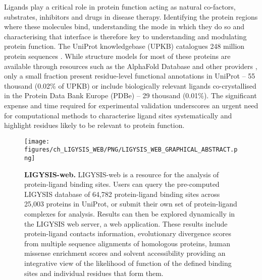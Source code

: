 Ligands play a critical role in protein function acting as natural co-factors, substrates, inhibitors and drugs in disease therapy. Identifying the protein regions where these molecules bind, understanding the mode in which they do so and characterising that interface is therefore key to understanding and modulating protein function. The UniProt knowledgebase (UPKB) catalogues 248 million protein sequences \cite{UNIPROT_2018_UNIPROT, UNIPROT_2023_UNIPROT}. While structure models for most of these proteins are available through resources such as the AlphaFold Database \cite{JUMPER_2021_ALPHAFOLD, VARADI_2022_ALPHAFOLDDB, ABRAMSON_2024_ALPHAFOLD3} and other providers \cite{GUEX_2009_SWISSMODEL, BEIENERT_2016_SWISSMODEL, WATERHOUSE_2018_SWISSMODEL}, only a small fraction present residue-level functional annotations in UniProt – 55 thousand (0.02\% of UPKB) or include biologically relevant ligands co-crystallised in the Protein Data Bank Europe (PDBe) \cite{BERMAN_2003_PDB, wwPDB_2019_PDB} – 29 thousand (0.01\%). The significant expense and time required for experimental validation underscores an urgent need for computational methods to characterise ligand sites  systematically and highlight residues likely to be relevant to protein function.

\begin{figure}[htb!]
    \centering
    \texttt{[image: figures/ch\_LIGYSIS\_WEB/PNG/LIGYSIS\_WEB\_GRAPHICAL\_ABSTRACT.png]}
    \caption[LIGYSIS-web]{\textbf{LIGYSIS-web.} LIGYSIS-web is a resource for the analysis of protein-ligand binding sites. Users can query the pre-computed LIGYSIS database of 64,782 protein-ligand binding sites across 25,003 proteins in UniProt, or submit their own set of protein-ligand complexes for analysis. Results can then be explored dynamically in the LIGYSIS web server, a web application. These results include protein-ligand contacts information, evolutionary divergence scores from multiple sequence alignments of homologous proteins, human missense enrichment scores and solvent accessibility providing an integrative view of the likelihood of function of the defined binding sites and individual residues that form them.}
    \label{fig:LIGYSIS_WEB}
\end{figure}

